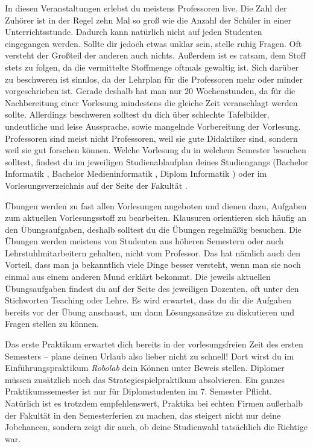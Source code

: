 In diesen Veranstaltungen erlebst du meistens Professoren live.
Die Zahl der Zuhörer ist in der Regel zehn Mal so groß wie die Anzahl der Schüler in einer Unterrichtsstunde. Dadurch kann natürlich nicht auf jeden Studenten eingegangen werden.
Sollte dir jedoch etwas unklar sein, stelle ruhig Fragen. Oft versteht der Großteil der anderen auch nichts.
Außerdem ist es ratsam, dem Stoff stets zu folgen, da die vermittelte Stoffmenge oftmals gewaltig ist. Sich darüber zu beschweren ist sinnlos, da der Lehrplan für die Professoren mehr oder minder vorgeschrieben ist.
Gerade deshalb hat man nur 20 Wochenstunden, da für die Nachbereitung einer Vorlesung mindestens die gleiche Zeit veranschlagt werden sollte.
Allerdings beschweren solltest du dich über schlechte Tafelbilder, undeutliche und leise Aussprache, sowie mangelnde Vorbereitung der Vorlesung.
Professoren sind meist nicht Professoren, weil sie gute Didaktiker sind, sondern weil sie gut forschen können.
Welche Vorlesung du in welchem Semester besuchen solltest, findest du im jeweiligen Studienablaufplan deines Studiengangs
(Bachelor Informatik , Bachelor Medieninformatik , Diplom Informatik ) oder im Vorlesungsverzeichnis auf der Seite der Fakultät .



Übungen werden zu fast allen Vorlesungen angeboten und dienen dazu, Aufgaben zum aktuellen Vorlesungsstoff zu bearbeiten. Klausuren orientieren sich häufig an den Übungsaufgaben, deshalb solltest du die Übungen
regelmäßig besuchen. Die Übungen werden meistens von Studenten aus höheren Semestern oder auch Lehrstuhlmitarbeitern gehalten, nicht vom Professor.
Das hat nämlich auch den Vorteil, dass man ja bekanntlich viele Dinge besser versteht, wenn man sie noch einmal aus einem anderen Mund erklärt bekommt.
Die jeweils aktuellen Übungsaufgaben findest du auf der Seite des jeweiligen Dozenten, oft unter den Stichworten Teaching oder Lehre.
Es wird erwartet, dass du dir die Aufgaben bereits vor der Übung anschaust, um dann Lösungsansätze zu diskutieren und Fragen stellen zu können.



Das erste Praktikum erwartet dich bereits in der vorlesungsfreien Zeit des ersten Semesters – plane deinen Urlaub also lieber nicht zu schnell!
Dort wirst du im Einführungspraktikum \textit{Robolab} dein Können unter Beweis stellen. Diplomer müssen zusätzlich noch das Strategiespielpraktikum absolvieren.
Ein ganzes Praktikumssemester ist nur für Diplomstudenten im 7. Semester Pflicht.
Natürlich ist es trotzdem empfehlenswert, Praktika bei echten Firmen außerhalb der Fakultät in den Semesterferien zu machen, das steigert nicht nur deine Jobchancen,
sondern zeigt dir auch, ob deine Studienwahl tatsächlich die Richtige war.

